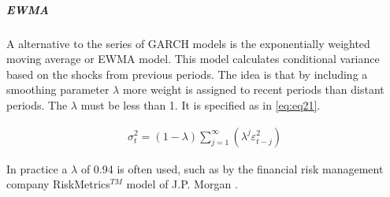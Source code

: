 \documentclass[a4paper, twoside]{templates/ociamthesis}
\newcommand*{\bibtitle}{Works Cited}
\begin{document}
\newpage

\hypertarget{ewma}{%
\subparagraph{EWMA}\label{ewma}}

\noindent A alternative to the series of GARCH models is the exponentially weighted moving average or EWMA model. This model calculates conditional variance based on the shocks from previous periods. The idea is that by including a smoothing parameter \(\lambda\) more weight is assigned to recent periods than distant periods. The \(\lambda\) must be less than 1. It is specified as in \eqref{eq:eq21}.

\begin{align}
\sigma_t^2 = (1-\lambda) \sum\limits_{j=1}^\infty (\lambda^j \varepsilon_{t-j}^2)
 \label{eq:eq21}
\end{align}

In practice a \(\lambda\) of 0.94 is often used, such as by the financial risk management company RiskMetrics\(^{TM}\) model of J.P. Morgan \autocite{morganguarantytrustcompany1996}.




\setlength{\baselineskip}{0pt} %

{\renewcommand*\MakeUppercase[1]{#1}%
\printbibliography[heading=bibintoc,title={\bibtitle}]}
\end{document}
